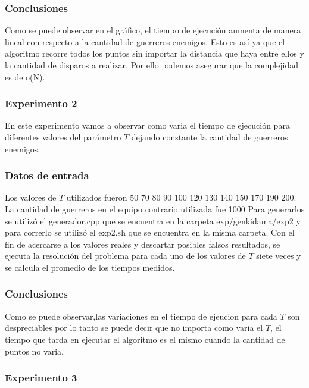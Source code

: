     	\subsubsection*{Conclusiones}\;
			Como se puede observar en el gráfico, el tiempo de ejecución aumenta de manera lineal con respecto a la cantidad de guerreros enemigos. Esto es así ya que el algoritmo recorre todos los puntos sin importar la distancia que haya entre ellos y la cantidad de disparos a realizar. Por ello podemos asegurar que la complejidad es de o(N).\;
			\;


		\subsubsection*{Experimento 2}\;
			En este experimento vamos a observar como varia el tiempo de ejecución para diferentes valores del parámetro $T$ dejando constante la cantidad de guerreros enemigos.\;

		\subsubsection*{Datos de entrada}\;

			Los valores de $T$ utilizados fueron $50$ $70$ $80$ $90$ $100$ $120$ $130$ $140$ $150$ $170$ $190$ $200$.\;
			La cantidad de guerreros en el equipo contrario utilizada fue 1000
			Para generarlos se utilizó el generador.cpp que se encuentra en la carpeta exp/genkidama/exp2 y para correrlo se utilizó el exp2.sh que se encuentra en la misma carpeta.\;
			Con el fin de acercarse a los valores reales y descartar posibles falsos resultados, se ejecuta la resolución del problema para cada uno de los valores de $T$ siete veces y se calcula el promedio de los tiempos medidos.\;
    	
    	\subsubsection*{Conclusiones}\;

			Como se puede observar,las variaciones en el tiempo de ejeucion para cada $T$ son despreciables por lo tanto se puede decir que no importa como varia el $T$, el tiempo que tarda en ejecutar el algoritmo es el mismo cuando la cantidad de puntos no varia.\;
		\;

    	\subsubsection*{Experimento 3}\;

